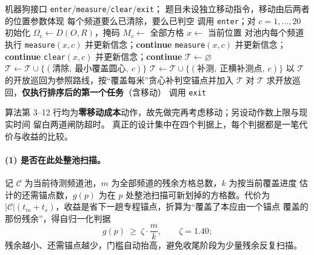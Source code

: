 \documentclass[withoutpreface, bwprint]{cumcmthesis}
\begin{document}
\begin{algorithm}[H]
\caption{全向干扰源的一体化搜索定位清除策略}
\label{alg:p3main}
\begin{algorithmic}[1]
\Require 机器狗接口 \texttt{enter}/\texttt{measure}/\texttt{clear}/\texttt{exit}；
  题目未设独立移动指令，移动由后两者的位置参数体现
\Ensure 每个频道要么已清除，要么已判空
\State 调用 \texttt{enter}；对 $c=1,\dots,20$ 初始化 $\Omega_c\gets D(O,R)$，掩码 $M_c\gets$ 全部方格
  \State $x\gets$ 当前位置
    \State 对池内每个频道执行 \texttt{measure}$(x,c)$ 并更新信念；\textbf{continue}
  \EndIf
    \State \texttt{measure}$(x,c)$ 并更新信念；\textbf{continue}
  \EndIf
    \State \texttt{clear}$(x,c)$ 并更新信念；\textbf{continue}
  \EndIf
  \State $\mathcal{T}\gets\varnothing$ 
      \State $\mathcal{T}\gets\mathcal{T}\cup\{(\text{清除},\ \text{最小覆盖圆心},\ c)\}$
    \Else
      \State $\mathcal{T}\gets\mathcal{T}\cup\{(\text{补测},\ \text{正横补测点},\ c)\}$
    \EndIf
  \EndFor
    \State 以 $\mathcal{T}$ 的开放巡回为参照路线，按“覆盖每米”贪心补判空锚点并加入 $\mathcal{T}$
  \EndIf
  \State 对 $\mathcal{T}$ 求开放巡回，\textbf{仅执行排序后的第一个任务}（含移动）
\EndWhile
\State 调用 \texttt{exit}
\end{algorithmic}
\end{algorithm}

算法第 3--12 行均为\textbf{零移动成本}动作，故先做完再考虑移动；另设动作数上限与现实时间
留白两道闸防超时。
真正的设计集中在四个判据上，每个判据都是一笔代价与收益的比较。

\paragraph{(1) 是否在此处整池扫描。}
记 $\mathcal{C}$ 为当前待测频道池，$m$ 为全部频道的残余方格总数，$k$ 为按当前覆盖进度
估计的还需锚点数，$g(p)$ 为在 $p$ 处整池扫描可新划掉的方格数。代价为
$\lvert\mathcal{C}\rvert(t_m+t_s)$，收益是省下一趟专程锚点，折算为“覆盖了本应由一个锚点
覆盖的那份残余”，得自归一化判据
\begin{equation}
  \label{eq:p3scan}
  g(p)\ \ge\ \zeta\cdot\frac{m}{k},\qquad \zeta=1.40 ;
\end{equation}
残余越小、还需锚点越少，门槛自动抬高，避免收尾阶段为少量残余反复扫描。
\end{document}
